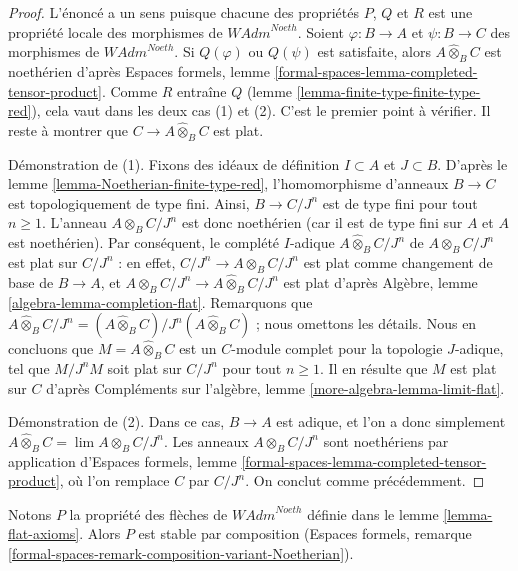 \begin{proof}
L'énoncé a un sens puisque chacune des propriétés $P$, $Q$ et $R$ est
une propriété locale des morphismes de $\textit{WAdm}^{Noeth}$.
Soient $\varphi : B \to A$ et $\psi : B \to C$ des morphismes de
$\textit{WAdm}^{Noeth}$. Si $Q(\varphi)$ ou $Q(\psi)$ est satisfaite,
alors $A \widehat{\otimes}_B C$ est noethérien d'après Espaces formels,
lemme \ref{formal-spaces-lemma-completed-tensor-product}. Comme $R$
entraîne $Q$ (lemme \ref{lemma-finite-type-finite-type-red}), cela vaut
dans les deux cas (1) et (2). C'est le premier point à vérifier. Il reste
à montrer que $C \to A \widehat{\otimes}_B C$ est plat.

\medskip\noindent
Démonstration de (1). Fixons des idéaux de définition $I \subset A$ et
$J \subset B$. D'après le lemme \ref{lemma-Noetherian-finite-type-red},
l'homomorphisme d'anneaux $B \to C$ est topologiquement de type fini.
Ainsi, $B \to C/J^n$ est de type fini pour tout $n \geq 1$. L'anneau
$A \otimes_B C/J^n$ est donc noethérien (car il est de type fini sur
$A$ et $A$ est noethérien). Par conséquent, le complété $I$-adique
$A \widehat{\otimes}_B C/J^n$ de $A \otimes_B C/J^n$ est plat sur
$C/J^n$ : en effet, $C/J^n \to A \otimes_B C/J^n$ est plat comme
changement de base de $B \to A$, et
$A \otimes_B C/J^n \to A \widehat{\otimes}_B C/J^n$ est plat d'après
Algèbre, lemme \ref{algebra-lemma-completion-flat}. Remarquons que
$A \widehat{\otimes}_B C/J^n =
(A \widehat{\otimes}_B C)/J^n(A \widehat{\otimes}_B C)$ ; nous omettons
les détails. Nous en concluons que $M = A \widehat{\otimes}_B C$ est un
$C$-module complet pour la topologie $J$-adique, tel que $M/J^nM$ soit
plat sur $C/J^n$ pour tout $n \geq 1$. Il en résulte que $M$ est plat sur
$C$ d'après Compléments sur l'algèbre, lemme
\ref{more-algebra-lemma-limit-flat}.

\medskip\noindent
Démonstration de (2). Dans ce cas, $B \to A$ est adique, et l'on a donc
simplement $A \widehat{\otimes}_B C = \lim A \otimes_B C/J^n$.
Les anneaux $A \otimes_B C/J^n$ sont noethériens par application
d'Espaces formels, lemme \ref{formal-spaces-lemma-completed-tensor-product},
où l'on remplace $C$ par $C/J^n$. On conclut comme précédemment.
\end{proof}

\begin{lemma}
\label{lemma-composition-flat-continuous}
Notons $P$ la propriété des flèches de $\textit{WAdm}^{Noeth}$ définie
dans le lemme \ref{lemma-flat-axioms}. Alors $P$ est stable par composition
(Espaces formels, remarque
\ref{formal-spaces-remark-composition-variant-Noetherian}).
\end{lemma}

